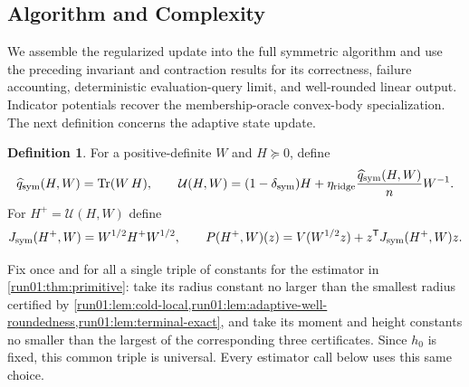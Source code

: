 \documentclass[11pt]{article}
\numberwithin{equation}{section}
\theoremstyle{definition}
\newtheorem{definition}[definition]{Definition}
\begin{document}
\subsection{Algorithm and Complexity}
\label{sec:symmetric-algorithm}

We assemble the regularized update into the full symmetric algorithm and use the
preceding invariant and contraction results for its correctness, failure
accounting, deterministic evaluation-query limit, and well-rounded linear
output.
Indicator potentials recover the membership-oracle convex-body specialization.
The next definition concerns the adaptive state update.

\begin{definition}
\label{run01:def:adaptive-update}
For a positive-definite $W$ and
$H\succeq0$, define
\[
\widehat q_{\rm sym}(H,W)=\operatorname{Tr}(W\,H),
\qquad
\mathcal U(H,W)=(1-\delta_{\rm sym})H+ \eta_{\rm ridge}\frac{\widehat q_{\rm sym}(H,W)}nW^{-1}.
\]
For $H^+=\mathcal U(H,W)$ define
\[
J_{\rm sym}(H^+,W)=W^{1/2}H^+W^{1/2},
\qquad
P(H^+,W)(z)=V(W^{1/2}z)+z^{\mathsf T} J_{\rm sym}(H^+,W)z.
\]
\end{definition}

Fix once and for all a single triple of constants for the estimator in
\cref{run01:thm:primitive}: take its radius constant no larger than the smallest
radius certified by
\cref{run01:lem:cold-local,run01:lem:adaptive-well-roundedness,run01:lem:terminal-exact},
and take its moment and height constants no smaller than the largest of the
corresponding three certificates.
Since $h_0$ is fixed, this common triple is universal.
Every estimator call below uses this same choice.
\end{document}

